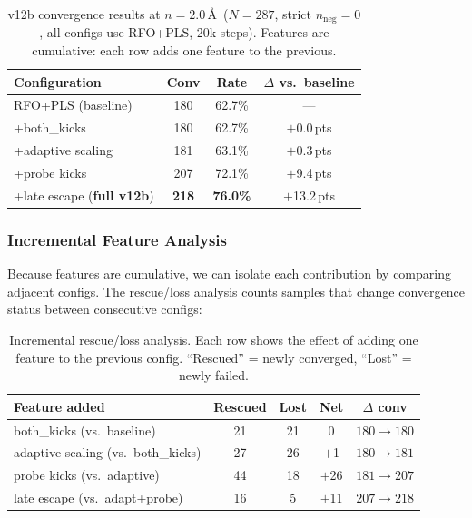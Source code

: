 \documentclass[11pt,a4paper]{article}
\theoremstyle{definition}
\begin{document}
\begin{table}[h]
\centering
\caption{v12b convergence results at $n=2.0$\,\AA\ ($N=287$, strict
  $n_\text{neg}=0$, all configs use RFO+PLS, 20k steps).  Features
  are cumulative: each row adds one feature to the previous.}
\label{tab:v12b}
\begin{tabular}{lccc}
\toprule
Configuration & Conv & Rate & $\Delta$ vs.\ baseline \\
\midrule
RFO+PLS (baseline)               & 180 & 62.7\% & ---        \\
+both\_kicks                      & 180 & 62.7\% & $+$0.0\,pts \\
+adaptive scaling                 & 181 & 63.1\% & $+$0.3\,pts \\
+probe kicks                      & 207 & 72.1\% & $+$9.4\,pts \\
+late escape (\textbf{full v12b}) & \textbf{218} & \textbf{76.0\%} & $+$13.2\,pts \\
\bottomrule
\end{tabular}
\end{table}

\subsubsection{Incremental Feature Analysis}
\label{sec:v12b-incremental}

Because features are cumulative, we can isolate each contribution by
comparing adjacent configs.  The rescue/loss analysis counts samples that
change convergence status between consecutive configs:

\begin{table}[h]
\centering
\caption{Incremental rescue/loss analysis.  Each row shows the effect of
  adding one feature to the previous config.  ``Rescued'' = newly converged,
  ``Lost'' = newly failed.}
\label{tab:v12b-incremental}
\begin{tabular}{lcccc}
\toprule
Feature added & Rescued & Lost & Net & $\Delta$ conv \\
\midrule
both\_kicks (vs.\ baseline) &  21 & 21 &   0 & $180 \to 180$ \\
adaptive scaling (vs.\ both\_kicks) & 27 & 26 & $+$1 & $180 \to 181$ \\
probe kicks (vs.\ adaptive) & 44 & 18 & $+$26 & $181 \to 207$ \\
late escape (vs.\ adapt+probe) & 16 &  5 & $+$11 & $207 \to 218$ \\
\bottomrule
\end{tabular}
\end{table}
\end{document}
